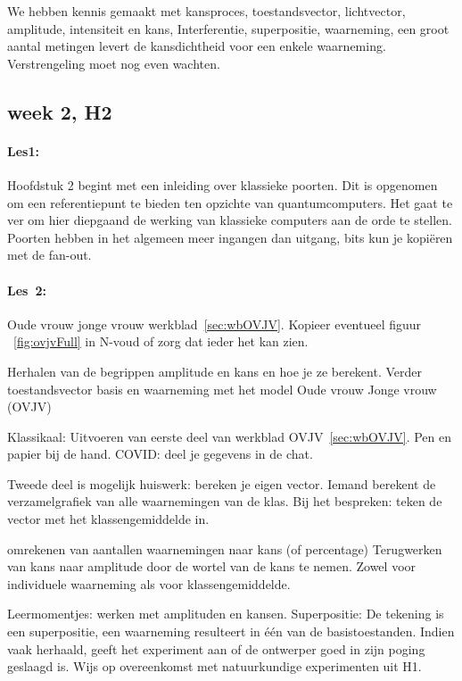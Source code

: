 \documentclass[../../main.tex]{subfiles}
\begin{document}
We hebben kennis gemaakt met kansproces, toestandsvector, lichtvector, amplitude, intensiteit en kans, Interferentie, superpositie, waarneming, een groot aantal metingen levert de kansdichtheid voor een enkele waarneming. Verstrengeling moet nog even wachten.

\subsection*{week 2, H2}
\paragraph*{Les1:} Hoofdstuk 2 begint met een inleiding over klassieke poorten. Dit is  opgenomen om een referentiepunt te bieden ten opzichte van quantumcomputers. Het gaat te ver om hier  diepgaand de werking van klassieke computers aan de orde te stellen. Poorten hebben in het algemeen meer ingangen dan uitgang, bits kun je kopi\"eren met de fan-out.



\paragraph{Les~2:} Oude vrouw jonge vrouw werkblad~\ref{sec:wbOVJV}.
Kopieer eventueel figuur ~\ref{fig:ovjvFull} in N-voud of zorg dat ieder het kan zien.

Herhalen van de begrippen amplitude en kans en hoe je ze berekent. Verder toestandsvector basis en waarneming met het model Oude vrouw Jonge vrouw (OVJV)

Klassikaal: Uitvoeren van eerste deel van werkblad OVJV~\ref{sec:wbOVJV}. Pen en papier bij de hand. COVID: deel je gegevens in de chat.

Tweede deel is mogelijk huiswerk: bereken je eigen vector. Iemand berekent de verzamelgrafiek van alle waarnemingen van de klas. Bij het bespreken: teken de vector met het klassengemiddelde in.

omrekenen van aantallen waarnemingen naar kans (of percentage)
Terugwerken van kans naar amplitude door de wortel van de kans te nemen. Zowel voor individuele waarneming als voor klassengemiddelde.

Leermomentjes: werken met amplituden en kansen. Superpositie: De tekening  is een superpositie, een waarneming resulteert in \'e\'en van de basistoestanden. Indien vaak herhaald, geeft het experiment aan of de ontwerper goed in zijn poging geslaagd is. Wijs op overeenkomst met natuurkundige experimenten uit H1.
\end{document}
